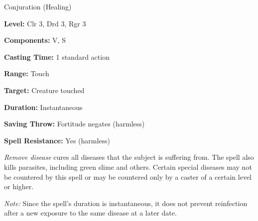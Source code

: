 
Conjuration (Healing)

\textbf{Level:} Clr 3, Drd 3, Rgr 3

\textbf{Components:} V, S

\textbf{Casting Time:} 1 standard action

\textbf{Range:} Touch

\textbf{Target:} Creature touched

\textbf{Duration:} Instantaneous

\textbf{Saving Throw:} Fortitude negates (harmless)

\textbf{Spell Resistance:} Yes (harmless)

\textit{Remove disease} cures all diseases that the subject is suffering from. 
The spell also kills parasites, including green slime and others. Certain special 
diseases may not be countered by this spell or may be countered only by a caster 
of a certain level or higher.

\textit{Note:} Since the spell's duration is instantaneous, it does not prevent 
reinfection after a new exposure to the same disease at a later date.

